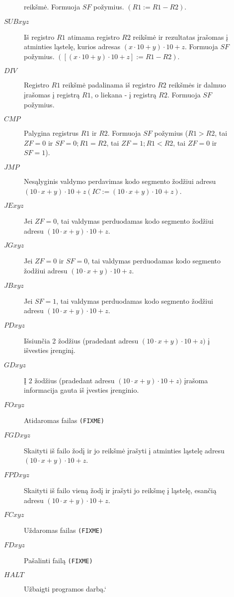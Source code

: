 \begin{description}
\begin{description}
          reikšmė. Formuoja $SF$ požymius. $(R1:=R1-R2)$.
        \item[$SUB xyz$] Iš registro $R1$ atimama registro $R2$ reikšmė ir 
          rezultatas įrašomas į atminties ląstelę, kurios adresas 
          $(x \cdot 10+y) \cdot 10+z$. Formuoja $SF$ požymius. 
          $([(x \cdot 10+y) \cdot 10+z]:=R1-R2)$.
        \item[$DIV$] Registro $R1$ reikšmė padalinama iš registro $R2$ 
          reikšmės ir dalmuo įrašomas į registrą $R1$, o liekana - į 
          registrą $R2$. Formuoja $SF$ požymius.
        \item[$CMP$] Palygina registrus $R1$ ir $R2$. Formuoja $SF$ požymius
          ($R1>R2$, tai $ZF=0$ ir $SF=0; R1=R2$, tai $ZF=1; R1<R2$, 
          tai $ZF=0$ ir $SF=1$).
        \item[$JMP$] Nesąlyginis valdymo perdavimas kodo segmento žodžiui
          adresu 
          $(10 \cdot x+y) \cdot 10+z (IC:=(10 \cdot x+y) \cdot 10+z)$.
        \item[$JE xyz$] Jei $ZF=0$, tai valdymas perduodamas kodo segmento 
          žodžiui adresu $(10 \cdot x+y) \cdot 10+z$.
        \item[$JG xyz$] Jei $ZF=0$ ir $SF=0$, tai valdymas perduodamas kodo
          segmento žodžiui adresu $(10 \cdot x+y) \cdot 10+z$.
        \item[$JB xyz$] Jei $SF=1$, tai valdymas perduodamas kodo segmento
          žodžiui adresu $(10 \cdot x+y) \cdot 10+z$.
        \item[$PD xyz$] Išsiunčia 2 žodžius (pradedant adresu 
          $(10 \cdot x+y) \cdot 10+z)$ į išvesties įrenginį.
        \item[$GD xyz$] Į 2 žodžius (pradedant adresu 
          $(10 \cdot x+y) \cdot 10+z)$ įrašoma informacija gauta iš 
          įvesties įrenginio.
        \item[$FO xyz$] Atidaromas failas \verb|(FIXME)|%
        \item[$FGD xyz$] Skaityti iš failo žodį ir jo reikšmė įrašyti į
          atminties ląstelę adresu $(10 \cdot x+y) \cdot 10+z$.
        \item[$FPD xyz$] Skaityti iš failo vieną žodį ir įrašyti jo 
          reikšmę į ląstelę, esančią adresu $(10 \cdot x+y) \cdot 10+z$.
        \item[$FC xyz$] Uždaromas failas \verb|(FIXME)|%
        \item[$FD xyz$] Pašalinti failą \verb|(FIXME)|%
        \item[$HALT$] Užbaigti programos darbą.`
    \end{description}
  \end{description} 
  
